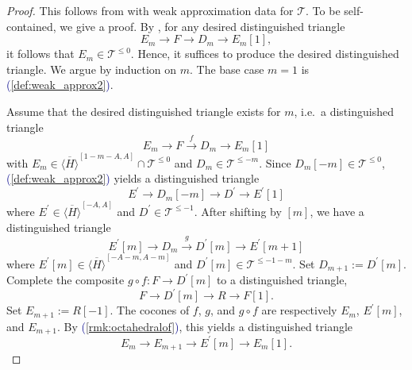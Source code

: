 \documentclass[11pt]{amsart}
\def\eqref#1{\textcolor{darkblue}{(\ref{#1})}}
\theoremstyle{plain}
\theoremstyle{definition}
\numberwithin{equation}{section}
\numberwithin{theorem}{section}
\begin{document}
\begin{proof}
    This follows from \cite[Corollary 3.2(1)]{Neeman:2026} with weak approximation data for $\mathcal{T}$.
    To be self-contained, we give a proof.
    By , for any desired distinguished triangle 
    \begin{displaymath}
        E_m\to F\to D_m\to E_m[1],
    \end{displaymath}
    it follows that $E_m\in \mathcal{T}^{\leq 0}$.
    Hence, it suffices to produce the desired distinguished triangle.
    We argue by induction on $m$. 
    The base case $m=1$ is \eqref{def:weak_approx2}.

    Assume that the desired distinguished triangle exists for $m$, i.e.\ a distinguished triangle 
    \begin{displaymath}
        E_m\to F\xrightarrow{f} D_m\to E_m[1]
    \end{displaymath}
    with $E_m\in \overline{\langle H\rangle}^{[1-m-A,A]} \cap \mathcal{T}^{\leq 0}$ and $D_m\in \mathcal{T}^{\leq -m}$. 
    Since $D_m[-m]\in \mathcal{T}^{\leq 0}$, \eqref{def:weak_approx2} yields a distinguished triangle 
    \begin{displaymath}
        E^\prime \to D_m[-m]\to D^\prime \to E^\prime[1]
    \end{displaymath}
    where $E^\prime \in \overline{\langle H\rangle}^{[-A,A]}$ and $D^\prime \in \mathcal{T}^{\leq -1}$.
    After shifting by $[m]$, we have a distinguished triangle 
    \begin{displaymath}
        E^\prime[m]\to D_m\xrightarrow{g} D^\prime[m]\to E^\prime[m+1]
    \end{displaymath}
    where $E^\prime[m]\in \overline{\langle H\rangle}^{[-A-m,A-m]}$ and $D^\prime[m]\in \mathcal{T}^{\leq -1-m}$.
    Set $D_{m+1} := D^\prime[m]$. 
    Complete the composite $g\circ f \colon F\to D^\prime[m]$ to a distinguished triangle,
    \begin{displaymath}
        F\to D^\prime[m] \to R \to F[1].
    \end{displaymath}
    Set $E_{m+1}:=R[-1]$. 
    The cocones of $f$, $g$, and $g\circ f$ are respectively $E_m$, $E^\prime[m]$, and $E_{m+1}$. 
    By \eqref{rmk:octahedralof}, this yields a distinguished triangle 
    \begin{displaymath}
        E_m \to E_{m+1} \to E^\prime [m] \to E_m [1].

\end{displaymath}
\end{proof}
\end{document}
